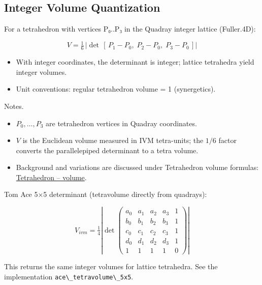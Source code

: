 \documentclass[
  10pt,
]{article}
\newcommand{\passthrough}[1]{#1}
\providecommand{\tightlist}{%
  \setlength{\itemsep}{0pt}\setlength{\parskip}{0pt}}
\begin{document}
\hypertarget{sec:integer_volume}{%
\subsection{Integer Volume Quantization}\label{sec:integer_volume}}

For a tetrahedron with vertices P₀..P₃ in the Quadray integer lattice
(Fuller.4D):

\begin{equation}\label{eq:lattice_det}
V = \tfrac{1}{6}\,\left|\det\,[\,P_1 - P_0,\; P_2 - P_0,\; P_3 - P_0\,]\right|
\end{equation}

\begin{itemize}
\tightlist
\item
  With integer coordinates, the determinant is integer; lattice
  tetrahedra yield integer volumes.
\item
  Unit conventions: regular tetrahedron volume = 1 (synergetics).
\end{itemize}

Notes.

\begin{itemize}
\tightlist
\item
  \(P_0,\ldots,P_3\) are tetrahedron vertices in Quadray coordinates.
\item
  \(V\) is the Euclidean volume measured in IVM tetra-units; the \(1/6\)
  factor converts the parallelepiped determinant to a tetra volume.
\item
  Background and variations are discussed under Tetrahedron volume
  formulas:
  \href{https://en.wikipedia.org/wiki/Tetrahedron\#Volume}{Tetrahedron
  -- volume}.
\end{itemize}

Tom Ace 5×5 determinant (tetravolume directly from quadrays):

\begin{equation}\label{eq:ace5x5}
V_{ivm} = \tfrac{1}{4} \left| \det \begin{pmatrix}
 a_0 & a_1 & a_2 & a_3 & 1 \\
 b_0 & b_1 & b_2 & b_3 & 1 \\
 c_0 & c_1 & c_2 & c_3 & 1 \\
 d_0 & d_1 & d_2 & d_3 & 1 \\
 1 & 1 & 1 & 1 & 0
\end{pmatrix} \right|
\end{equation}

This returns the same integer volumes for lattice tetrahedra. See the
implementation \passthrough{\lstinline!ace\_tetravolume\_5x5!}.
\end{document}
